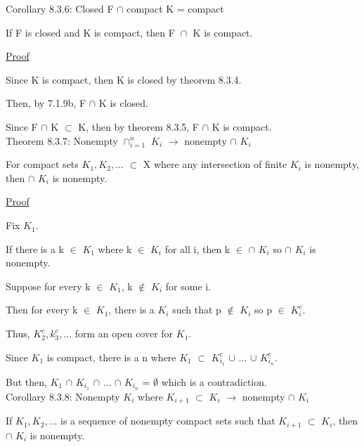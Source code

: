 { \color{orange} Corollary 8.3.6: Closed F $\cap$ compact K = compact } 

	\begin{adjustbox}{minipage=14cm, right, vspace=0.1cm 0cm}
		If F is closed and K is compact, then F $\cap_{}^{}$ K is compact.
	\end{adjustbox}

{ \color{magenta} \underline{Proof} } 

	Since K is compact, then K is closed by {\color{red} theorem 8.3.4}.

	Then, by {\color{red} 7.1.9b}, F $\cap$ K is closed.

	Since F $\cap$ K $\subset$ K, then by {\color{red} theorem 8.3.5},
	F $\cap$ K is compact. \\

{ \color{red} Theorem 8.3.7: Nonempty $\cap_{i=1}^n$ $K_i$ $\rightarrow$
nonempty $\cap$ $K_i$ } 

	\begin{adjustbox}{minipage=14cm, right, vspace=0.1cm 0cm}
		For compact sets $K_1, K_2, ...$ $\subset$ X where any intersection
		of finite $K_i$ is nonempty, then $\cap$ $K_i$ is nonempty.
	\end{adjustbox}

{ \color{magenta} \underline{Proof} } 

	Fix $K_1$.

	If there is a k $\in$ $K_1$ where k $\in$ $K_i$ for all i, then
	k $\in$ $\cap$ $K_i$ so $\cap$ $K_i$ is nonempty.

	Suppose for every k $\in$ $K_1$, k $\not \in$ $K_i$ for some i.

	Then for every k $\in$ $K_1$, there is a $K_i$ such that
	p $\not \in$ $K_i$ so p $\in$ $K_i^c$.

	Thus, $K_2^c, k_3^c, ...$ form an open cover for $K_1$.

	Since $K_1$ is compact, there is a n where
	$K_1$ $\subset$ $K_{i_1}^c$ $\cup$ ... $\cup$ $K_{i_n}^c$.

	But then, $K_1$ $\cap$ $K_{i_1}$ $\cap$ ... $\cap$ $K_{i_n}$
	= $\emptyset$ which is a contradiction. \\

{ \color{orange} Corollary 8.3.8: Nonempty $K_i$ where $K_{i+1}$ $\subset$ $K_i$
$\rightarrow$ nonempty $\cap$ $K_i$}

	\begin{adjustbox}{minipage=14cm, right, vspace=0.1cm 0cm}
		If $K_1, K_2, ...$ is a sequence of nonempty compact sets
		such that $K_{i+1}$ $\subset$ $K_i$, then $\cap$ $K_i$ is nonempty.
	\end{adjustbox}

